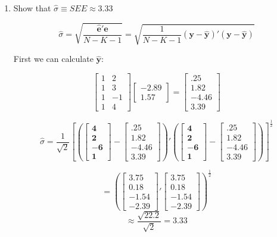 \documentclass[12pt]{article}
\begin{document}
\begin{enumerate}
  \item Show that $\hat{\sigma} \equiv SEE\approx  3.33$
  
\[
\hat{\sigma} = \sqrt{\frac{\mathbf{\hat{e}'\hat{e}}}{N-K-1}} = \sqrt{\frac{1}{N-K-1} \mathbf{(y - \hat{y})'(y - \hat{y})}}
\]

First we can calculate $\hat{\mathbf{y}}$:

\[
\left[ \begin{array}{cr} 1& 2 \\ 1&3\\  1 & -1\\ 1 & 4 \end{array} \right]   \left[ \begin{array}{r} -2.89 \\ 1.57 \end{array} \right] =  \left[ \begin{array}{r}  .25 \\ 1.82 \\ -4.46 \\ 3.39 \end{array} \right]
\]

\[
\hat{\sigma} = \frac{1}{\sqrt{2}} [( \mathbf{\left[\begin{array}{r} 4 \\ 2\\-6 \\1 \end{array}\right] - \left[\begin{array}{c}  .25 \\ 1.82 \\ -4.46 \\ 3.39 \end{array}\right]})' (\mathbf{\left[\begin{array}{r} 4 \\ 2\\-6 \\1 \end{array}\right] - \left[\begin{array}{c}  .25 \\ 1.82 \\ -4.46 \\ 3.39 \end{array}\right]})]^{\frac{1}{2}}
\]

\[
{} = (\left[\begin{array}{c} 3.75\\ 0.18\\-1.54 \\ -2.39 \end{array}\right]'\left[\begin{array}{c} 3.75\\ 0.18\\-1.54\\ -2.39 \end{array}\right])^{\frac{1}{2}}
\]
\[
\approx \frac{\sqrt{22.2} }{\sqrt{2} } = 3.33
\]


\end{enumerate}
\end{document}
